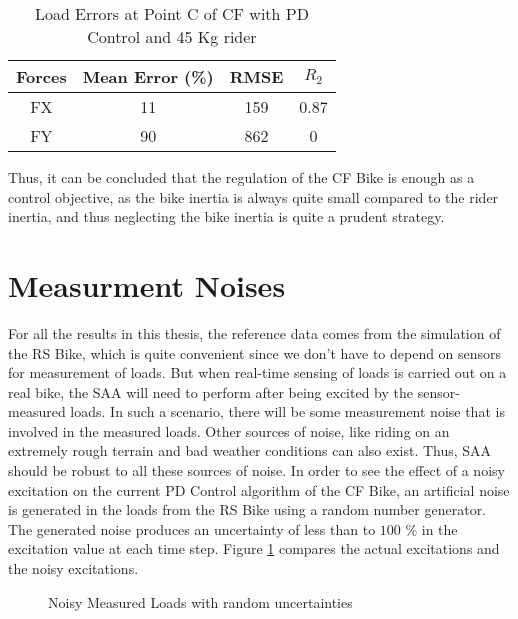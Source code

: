 \begin{table}[h!]
	\centering
	\begin{tabular}{ |c|c|c|c| } 
		\hline
		Forces & Mean Error (\%) & RMSE & $R_2$\\ 
		\hline
		FX & 11&159&0.87\\ 
		FY & 90&862&0 \\ 
		\hline
	\end{tabular}
	\caption{Load Errors at Point C of CF with PD Control and 45 Kg rider}
	\label{tab:pureFeedbkPDC45}
\end{table}

Thus, it can be concluded that the regulation of the CF Bike is enough as a control objective, as the bike inertia is always quite small compared to the rider inertia, and thus neglecting the bike inertia is quite a prudent strategy.

\section{Measurment Noises}
\label{sec:chap4sec2}

For all the results in this thesis, the reference data comes from the simulation of the RS Bike, which is quite convenient since we don't have to depend on sensors for measurement of loads. But when real-time sensing of loads is carried out on a real bike, the SAA will need to perform after being excited by the sensor-measured loads. In such a scenario, there will be some measurement noise that is involved in the measured loads. Other sources of noise, like riding on an extremely rough terrain and bad weather conditions can also exist. Thus, SAA should be robust to all these sources of noise. In order to see the effect of a noisy excitation on the current PD Control algorithm of the CF Bike, an artificial noise is generated in the loads from the RS Bike using a random number generator. The generated noise produces an uncertainty of less than to $100$ \% in the excitation value at each time step. Figure \ref{fig:Noise} compares the actual excitations and the noisy excitations.

\begin{figure}[h!]
	\centering
	\scalebox{0.6}{
		\begin{tikzpicture}
			
	\end{tikzpicture}}
	\caption{Noisy Measured Loads with random uncertainties}
	\label{fig:Noise}
\end{figure}


